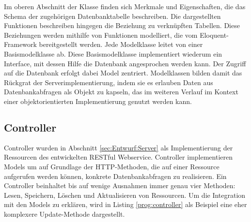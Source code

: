 \begin{program}[H]
\label{prog:model}
\end{program}

Im oberen Abschnitt der Klasse finden sich Merkmale und Eigenschaften, die das Schema der zugehörigen Datenbanktabelle beschreiben. Die dargestellten Funktionen beschreiben hingegen die Beziehung zu verknüpften Tabellen. Diese Beziehungen werden mithilfe von Funktionen modelliert, die vom Eloquent-Framework bereitgestellt werden. Jede Modelklasse leitet von einer Basismodelklasse ab. Diese Basismodelklasse implementiert wiederum ein Interface, mit dessen Hilfe die Datenbank angesprochen werden kann. Der Zugriff auf die Datenbank erfolgt dabei Model zentriert. Modelklassen bilden damit das Rückgrat der Serverimplementierung, indem sie es erlauben Daten aus Datenbankabfragen als Objekt zu kapseln, das im weiteren Verlauf im Kontext einer objektorientierten Implementierung genutzt werden kann.

\subsection{Controller}

Controller wurden in Abschnitt \ref{sec:Entwurf:Server} als Implementierung der Ressourcen des entwickelten RESTful Webservice. Controller implementieren Models um auf Grundlage der HTTP-Methoden, die auf einer Ressource aufgerufen werden können, konkrete Datenbankabfragen zu realisieren. Ein Controller beinhaltet bis auf wenige Ausnahmen immer genau vier Methoden: Lesen, Speichern, Löschen und Aktualisieren von Ressourcen. Um die Integration mit den Models zu erklären, wird in Listing \ref{prog:controller} als Beispiel eine eher komplexere Update-Methode dargestellt.

